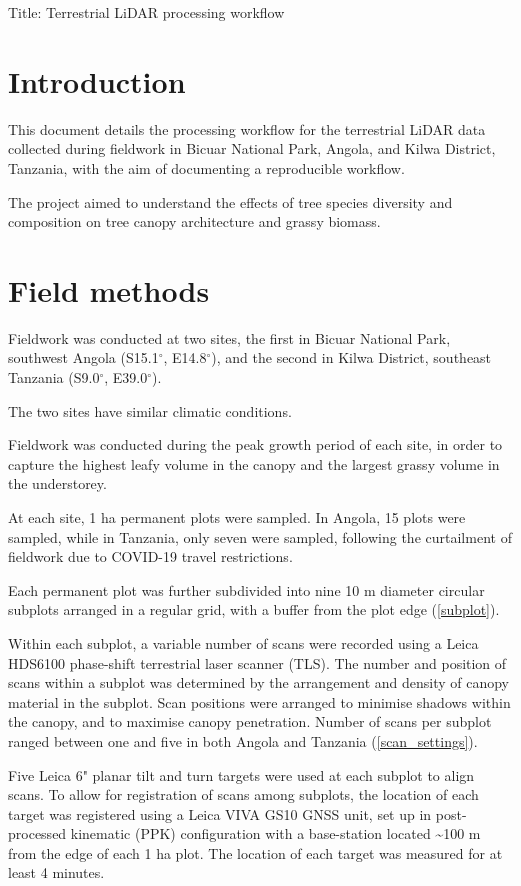 \documentclass[11pt,a4paper]{article}
\newcommand{\titletext}{Terrestrial LiDAR processing workflow}
\begin{document}
{\Large{Title: \titletext{}}}

\section{Introduction}

This document details the processing workflow for the terrestrial LiDAR data collected during fieldwork in Bicuar National Park, Angola, and Kilwa District, Tanzania, with the aim of documenting a reproducible workflow.

The project aimed to understand the effects of tree species diversity and composition on tree canopy architecture and grassy biomass.

\section{Field methods}

Fieldwork was conducted at two sites, the first in Bicuar National Park, southwest Angola (S15.1$^\circ$, E14.8$^\circ$), and the second in Kilwa District, southeast Tanzania (S9.0$^\circ$, E39.0$^\circ$). 

The two sites have similar climatic conditions.



Fieldwork was conducted during the peak growth period of each site, in order to capture the highest leafy volume in the canopy and the largest grassy volume in the understorey.

At each site, 1 ha permanent plots were sampled. In Angola, 15 plots were sampled, while in Tanzania, only seven were sampled, following the curtailment of fieldwork due to COVID-19 travel restrictions.

Each permanent plot was further subdivided into nine 10 m diameter circular subplots arranged in a regular grid, with a buffer from the plot edge (\autoref{subplot}).

Within each subplot, a variable number of scans were recorded using a Leica HDS6100 phase-shift terrestrial laser scanner (TLS). The number and position of scans within a subplot was determined by the arrangement and density of canopy material in the subplot. Scan positions were arranged to minimise shadows within the canopy, and to maximise canopy penetration. Number of scans per subplot ranged between one and five in both Angola and Tanzania (\autoref{scan_settings}).

Five Leica 6" planar tilt and turn targets were used at each subplot to align scans. To allow for registration of scans among subplots, the location of each target was registered using a Leica VIVA GS10 GNSS unit, set up in post-processed kinematic (PPK) configuration with a base-station located \textasciitilde{}100 m from the edge of each 1 ha plot. The location of each target was measured for at least 4 minutes. 
\end{document}
